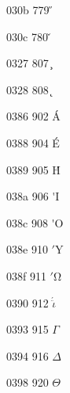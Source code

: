 \documentclass[11pt]{article}
\begin{document}
030b 779 \H{}

030c 780 \v{}







0327 807 \c{}

0328 808 \k{}






%
%
%
%
%
%

0386 902 \'A

0388 904 \'E

0389 905 \'H

038a 906 \'{}{I}

038c 908 \'{}O

038e 910 \ensuremath{\mathrm{'Y}}

038f 911 \ensuremath{\mathrm{'\Omega}}

0390 912 \ensuremath{\acute{\ddot{\iota}}}



0393 915 \ensuremath{\Gamma}

0394 916 \ensuremath{\Delta}




0398 920 \ensuremath{\Theta}

\end{document}
